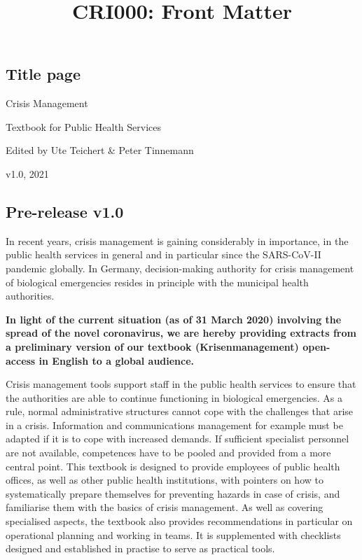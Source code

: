 \documentclass{article}
\begin{document}
\title{CRI000: Front Matter}

\maketitle


\subsection{Title page}\label{H353005}



Crisis Management


Textbook for Public Health Services


Edited by Ute Teichert \& Peter Tinnemann


v1.0, 2021


\subsection{Pre-release v1.0}\label{H6627615}



In recent years, crisis management is gaining considerably in importance, in the public health services in general and in particular since the SARS-CoV-II pandemic globally. In Germany, decision-making authority for crisis management of biological emergencies resides in principle with the municipal health authorities.


\textbf{In light of the current situation (as of 31 March 2020) involving the spread of the novel coronavirus, we are hereby providing extracts from a preliminary version of our textbook (Krisenmanagement) open-access in English to a global audience.}


Crisis management tools support staff in the public health services to ensure that the authorities are able to continue functioning in biological emergencies. As a rule, normal administrative structures cannot cope with the challenges that arise in a crisis. Information and communications management for example must be adapted if it is to cope with increased demands. If sufficient specialist personnel are not available, competences have to be pooled and provided from a more central point. This textbook is designed to provide employees of public health offices, as well as other public health institutions, with pointers on how to systematically prepare themselves for preventing hazards in case of crisis, and familiarise them with the basics of crisis management. As well as covering specialised aspects, the textbook also provides recommendations in particular on operational planning and working in teams. It is supplemented with checklists designed and established in practise to serve as practical tools.
\end{document}
